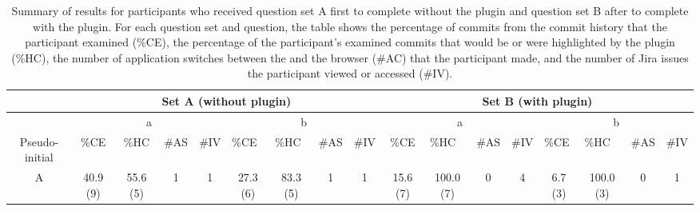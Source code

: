 \begin{landscape}
  \begin{table}[p]
    \footnotesize
    \caption{
      Summary of results for participants who received question set A first to complete without the plugin and question set B after to complete with the plugin.
      For each question set and question, the table shows the percentage of commits from the commit history that the participant examined (\%CE), 
      the percentage of the participant's examined commits that would be or were highlighted by the plugin (\%HC),
      the number of application switches between the  and the browser (\#AC) that the participant made,
      and the number of Jira issues the participant viewed or accessed (\#IV).
    }
    \centering
    \begin{tabular}{@{}ccccccccccccccccc@{}}
      \toprule
      \multicolumn{1}{l}{}                & \multicolumn{8}{c}{Set A (without plugin)}                                                                                                                            & \multicolumn{8}{c}{Set B (with plugin)}                                                                                                                                                                 \\ \midrule
      \multicolumn{1}{c|}{}               & \multicolumn{4}{c|}{a}                                   & \multicolumn{4}{c|}{b}                                                                                     & \multicolumn{4}{c|}{a}                                                                      & \multicolumn{4}{c}{b}                                                                                     \\ \midrule
      \multicolumn{1}{c|}{Pseudo-initial} & \%CE      & \%HC      & \#AS & \multicolumn{1}{l|}{\#IV} & \multicolumn{1}{l}{\%CE} & \multicolumn{1}{l}{\%HC} & \multicolumn{1}{l}{\#AS} & \multicolumn{1}{l|}{\#IV} & \%CE      & \multicolumn{1}{l}{\%HC} & \multicolumn{1}{l}{\#AS} & \multicolumn{1}{l|}{\#IV} & \multicolumn{1}{l}{\%CE} & \multicolumn{1}{l}{\%HC} & \multicolumn{1}{l}{\#AS} & \multicolumn{1}{l}{\#IV} \\ \midrule
      \multicolumn{1}{c|}{A}              & 40.9 (9)  & 55.6 (5)  & 1    & \multicolumn{1}{c|}{1}    & 27.3 (6)                 & 83.3 (5)                 & 1                        & \multicolumn{1}{c|}{1}    & 15.6 (7)  & 100.0 (7)                & 0                        & \multicolumn{1}{c|}{4}    & 6.7 (3)                  & 100.0 (3)                & 0                        & 1                        \\

\end{tabular}
\end{table}
\end{landscape}
